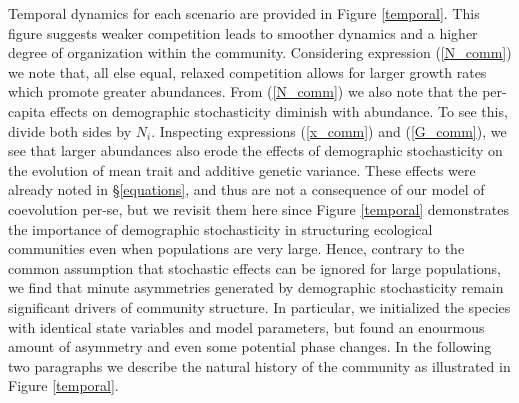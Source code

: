 \documentclass[]{elsarticle} %
\begin{document}
Temporal dynamics for each scenario are provided in Figure
\ref{temporal}. This figure suggests weaker competition leads to
smoother dynamics and a higher degree of organization within the
community. Considering expression (\ref{N_comm}) we note that, all else
equal, relaxed competition allows for larger growth rates which promote
greater abundances. From (\ref{N_comm}) we also note that the per-capita
effects on demographic stochasticity diminish with abundance. To see
this, divide both sides by \(N_i\). Inspecting expressions
(\ref{x_comm}) and (\ref{G_comm}), we see that larger abundances also
erode the effects of demographic stochasticity on the evolution of mean
trait and additive genetic variance. These effects were already noted in
\S\ref{equations}, and thus are not a consequence of our model of
coevolution per-se, but we revisit them here since Figure \ref{temporal}
demonstrates the importance of demographic stochasticity in structuring
ecological communities even when populations are very large. Hence,
contrary to the common assumption that stochastic effects can be ignored
for large populations, we find that minute asymmetries generated by
demographic stochasticity remain significant drivers of community
structure. In particular, we initialized the species with identical
state variables and model parameters, but found an enourmous amount of
asymmetry and even some potential phase changes. In the following two
paragraphs we describe the natural history of the community as
illustrated in Figure \ref{temporal}.
\end{document}
